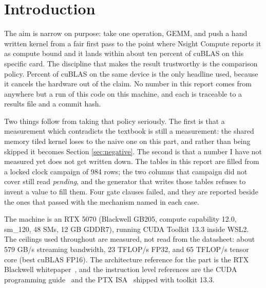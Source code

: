 \section{Introduction}

The aim is narrow on purpose: take one operation, GEMM, and push a hand written
kernel from a fair first pass to the point where Nsight Compute reports it as
compute bound and it lands within about ten percent of cuBLAS on this specific
card. The discipline that makes the result trustworthy is the comparison policy.
Percent of cuBLAS on the same device is the only headline used, because it cancels
the hardware out of the claim. No number in this report comes from anywhere but a
run of this code on this machine, and each is traceable to a results file and a
commit hash.

Two things follow from taking that policy seriously. The first is that a
measurement which contradicts the textbook is still a measurement: the shared
memory tiled kernel loses to the naive one on this part, and rather than being
skipped it becomes Section \ref{sec:negative}. The second is that a number I have
not measured yet does not get written down. The tables in this report are filled
from a locked clock campaign of 984 rows; the two columns that campaign did not
cover still read \emph{pending}, and the generator that writes those tables
refuses to invent a value to fill them. Four gate clauses failed, and they are
reported beside the ones that passed with the mechanism named in each case.

The machine is an RTX 5070 (Blackwell GB205, compute capability 12.0, sm\_120, 48
SMs, 12 GB GDDR7), running CUDA Toolkit 13.3 inside WSL2. The ceilings used
throughout are measured, not read from the datasheet: about 579 GB/s streaming
bandwidth, 23 TFLOP/s FP32, and 65 TFLOP/s tensor core (best cuBLAS FP16). The
architecture reference for the part is the RTX Blackwell
whitepaper~\cite{blackwell}, and the instruction level references are the CUDA
programming guide~\cite{cudaguide} and the PTX ISA~\cite{ptxisa} shipped with
toolkit 13.3.
